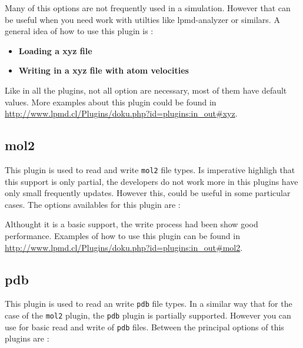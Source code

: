 Many of this options are not frequently used in a {\lpmd} simulation. However
that can be useful when you need work with utilties like lpmd-analyzer or
similars. A general idea of how to use this plugin is :

\begin{itemize}
 \item \textbf{Loading a xyz file}
 \item \textbf{Writing in a xyz file with atom velocities}
\end{itemize}

Like in all the plugins, not all option are necessary, most of them have
default values. More examples about this plugin could be found in
\url{http://www.lpmd.cl/Plugins/doku.php?id=plugins:in_out#xyz}.

\subsection{mol2}

This plugin is used to read and write \verb|mol2| file types. Is imperative
highligh that this support is only partial, the developers do not work more in
this plugins have only small frequently updates. However this, could be useful
in some particular cases. The options availables for this plugin are :


Althought it is a basic support, the write process had been show good
performance. Examples of how to use this plugin can be found in
\url{http://www.lpmd.cl/Plugins/doku.php?id=plugins:in_out#mol2}.

\subsection{pdb}

This plugin is used to read an write \verb|pdb| file types. In a similar way
that for the case of the \verb|mol2| plugin, the \verb|pdb| plugin is partially
supported. However you can use for basic read and write of \verb|pdb| files.
Between the principal options of this plugins are :


